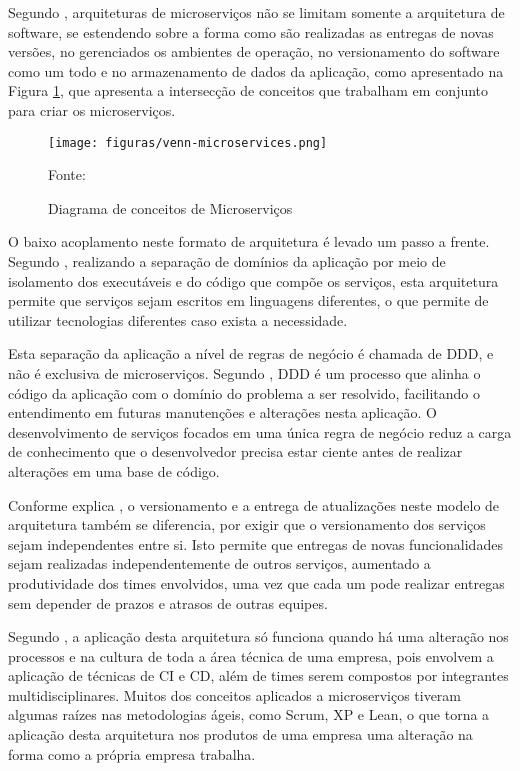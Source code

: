 Segundo , arquiteturas de microserviços não se limitam
somente a arquitetura de software, se estendendo sobre a forma como são
realizadas as entregas de novas versões, no gerenciados os ambientes
de operação, no versionamento do software como um todo e no armazenamento de
dados da aplicação, como apresentado na Figura \ref{fig:venn-microservices},
que apresenta a intersecção de conceitos que trabalham em conjunto para criar
os microserviços.

\begin{figure}[H]
	\centering
	\caption{Diagrama de conceitos de Microserviços}
	\texttt{[image: figuras/venn-microservices.png]}

	\label{fig:venn-microservices}
	\footnotesize Fonte: 
\end{figure}

O baixo acoplamento neste formato de arquitetura é levado um passo a frente.
Segundo , realizando a separação de domínios da
aplicação por meio de isolamento dos executáveis e do código que compõe os
serviços, esta arquitetura permite que serviços sejam escritos em linguagens
diferentes, o que permite de utilizar tecnologias diferentes caso exista
a necessidade.

Esta separação da aplicação a nível de regras de negócio é chamada de \ac{DDD},
e não é exclusiva de microserviços. Segundo , \ac{DDD}
é um processo que alinha o código da aplicação com o domínio do problema
a ser resolvido, facilitando o entendimento em futuras manutenções e
alterações nesta aplicação. O desenvolvimento de serviços focados em uma
única regra de negócio reduz a carga de conhecimento que o desenvolvedor
precisa estar ciente antes de realizar alterações em uma base de código.

Conforme explica , o versionamento e a entrega de
atualizações neste modelo de arquitetura também se diferencia, por exigir
que o versionamento dos serviços sejam independentes entre si. Isto permite
que entregas de novas funcionalidades sejam realizadas independentemente de
outros serviços, aumentado a produtividade dos times envolvidos, uma vez que
cada um pode realizar entregas sem depender de prazos e atrasos de outras
equipes.

Segundo , a aplicação desta arquitetura só funciona
quando há uma alteração nos processos e na cultura de toda a área técnica
de uma empresa, pois envolvem a aplicação de técnicas de \ac{CI} e \ac{CD},
além de times serem compostos por integrantes multidisciplinares. Muitos dos
conceitos aplicados a microserviços tiveram algumas raízes nas metodologias
ágeis, como Scrum, XP e Lean, o que torna a aplicação desta arquitetura nos
produtos de uma empresa uma alteração na forma como a própria empresa trabalha.

